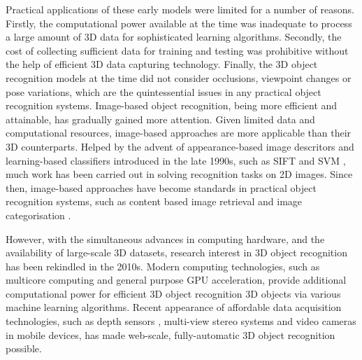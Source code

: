Practical applications of these early models were limited for a number of reasons. Firstly, the computational power available at the time was inadequate to process a large amount of 3D data for sophisticated learning algorithms. 
Secondly, the cost of collecting sufficient data for training and testing was prohibitive without the help of efficient 3D data capturing technology. 
Finally, the 3D object recognition models at the time did not consider occlusions, viewpoint changes or pose variations, which are the quintessential issues in any practical object recognition systems. 
Image-based object recognition, being more efficient and attainable, has gradually gained more attention. Given limited data and computational resources, image-based approaches are more applicable than their 3D counterparts.
Helped by the advent of appearance-based image descritors and learning-based classifiers introduced in the late 1990s, such as SIFT \cite{Lowe2004} and SVM \cite{Chapelle1999}, much work has been carried out in solving recognition tasks on 2D images. Since then, image-based approaches have become standards in practical object recognition systems, such as content based image retrieval \cite{Datta2008} and image categorisation \cite{Galleguillos2010}. 

However, with the simultaneous advances in computing hardware, and the availability of large-scale 3D datasets, research interest in 3D object recognition has been rekindled in the 2010s.  
Modern computing technologies, such as multicore computing and general purpose GPU acceleration, provide additional computational power for efficient 3D object recognition 3D objects via various machine learning algorithms. Recent appearance of affordable data acquisition technologies, such as depth sensors \cite{Shotton2011}, multi-view stereo systems \cite{Vogiatzis2011} and video cameras in mobile devices, has made web-scale, fully-automatic 3D object recognition possible.  

